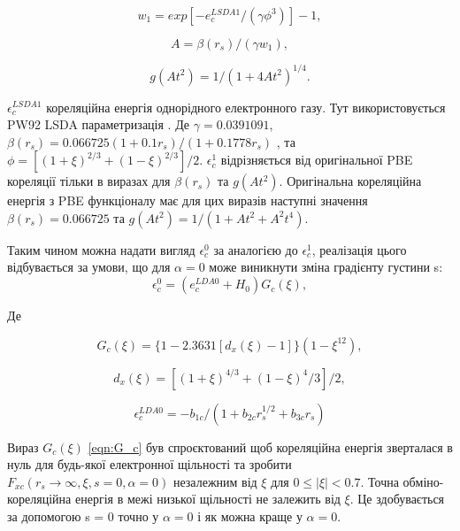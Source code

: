 \begin{equation}
	w_1 = exp[-e_c^{LSDA1}/(\gamma\phi^3)] - 1,
\end{equation}

\begin{equation}
	A = \beta(r_s)/(\gamma w_1),
\end{equation}

\begin{equation}
	g(At^2) = 1 / (1 + 4At^2)^{1/4}.
\end{equation}

$\epsilon_c^{LSDA1}$ кореляційна енергія однорідного електронного газу. Тут використовується PW92 LSDA параметризація \cite{PhysRevB.45}. Де $\gamma = 0.0391091$, $\beta(r_s) = 0.066725(1 + 0.1r_s)/(1 + 0.1778r_s)$ \cite{PhysRevLett.103}, та $\phi = [(1 + \xi)^{2/3} + (1 - \xi)^{2/3}]/2$. $\epsilon_c^1$ відрізняється від оригінальної PBE кореляції тільки в виразах для $\beta(r_s)$ та $g(At^2)$. Оригінальна кореляційна енергія з PBE  функціоналу \cite{PBE} має для цих виразів наступні значення $\beta(r_s) = 0.066725$ та $g(At^2) = 1 / (1 + At^2 + A^2 t^4)$.

Таким чином можна надати вигляд $\epsilon_c^0$ за аналогією до $\epsilon_c^1$, реалізація цього відбувається за умови, що для $\alpha = 0$ може виникнути зміна градієнту густини s:
\begin{equation}
	\epsilon_c^0 = (e_c^{LDA0} + H_0) G_c(\xi),
\end{equation}

Де 

\begin{equation}
	\label{eqn:G_c}
	G_c(\xi) = \big\{1 - 2.3631[d_x(\xi) - 1]\big\} (1 - \xi^12), 
\end{equation}

\begin{equation}
	d_x(\xi) = [(1+\xi)^{4/3} + (1 - \xi)^4/3] / 2,
\end{equation}

\begin{equation}
	\epsilon_c^{LDA0} = -b_{1c}/(1+b_{2c}r_s^{1/2}+b_{3c}r_s)
\end{equation}

Вираз $G_c(\xi)$ \ref{eqn:G_c} був спроєктований щоб кореляційна енергія зверталася в нуль для будь-якої електронної щільності та зробити $F_{xc}(r_s \rightarrow \infty, \xi, s = 0, \alpha = 0)$ незалежним від $\xi$ для $0 \leq |\xi| < 0.7$. Точна обміно-кореляційна енергія в межі низької щільності не залежить від $\xi$. Це здобувається за допомогою s = 0 точно у $\alpha = 0$ і як можна краще у $\alpha = 0$. 

